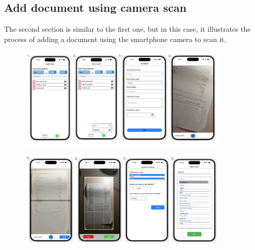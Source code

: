 	\subsection{Add document using camera scan}
		The second section is similar to the first one, but in this case, it illustrates the process of adding a document using the smartphone camera to scan it.
		\begin{figure}[htbp]
			\centering
			\includegraphics[width=0.9\textwidth]{../mockups/add_doc_cam_1.png}  %
		\end{figure}

		\begin{figure}[htbp]
			\centering
			\includegraphics[width=0.9\textwidth]{../mockups/add_doc_cam_2.png}  %
		\end{figure}
		\clearpage
